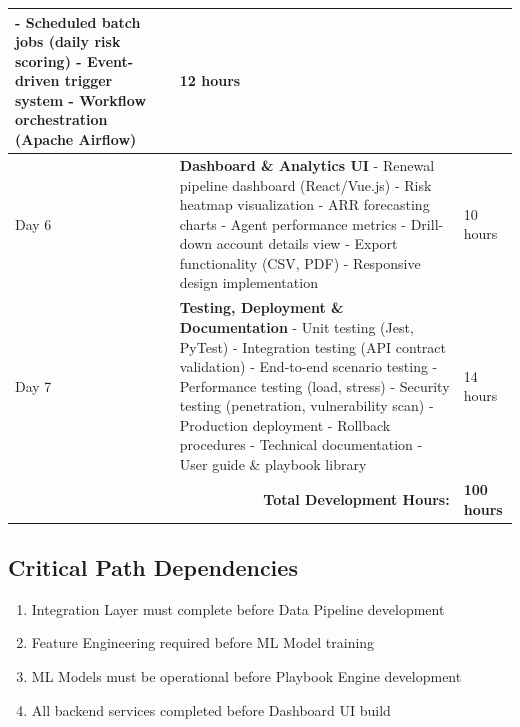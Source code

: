 \documentclass[12pt,a4paper]{article}
\begin{document}
\begin{longtable}{|p{2cm}|p{10cm}|p{2cm}|}
- Scheduled batch jobs (daily risk scoring) \newline
- Event-driven trigger system \newline
- Workflow orchestration (Apache Airflow) & 12 hours \\
\hline
Day 6 & \textbf{Dashboard \& Analytics UI} \newline
- Renewal pipeline dashboard (React/Vue.js) \newline
- Risk heatmap visualization \newline
- ARR forecasting charts \newline
- Agent performance metrics \newline
- Drill-down account details view \newline
- Export functionality (CSV, PDF) \newline
- Responsive design implementation & 10 hours \\
\hline
Day 7 & \textbf{Testing, Deployment \& Documentation} \newline
- Unit testing (Jest, PyTest) \newline
- Integration testing (API contract validation) \newline
- End-to-end scenario testing \newline
- Performance testing (load, stress) \newline
- Security testing (penetration, vulnerability scan) \newline
- Production deployment \newline
- Rollback procedures \newline
- Technical documentation \newline
- User guide \& playbook library & 14 hours \\
\hline
\multicolumn{2}{|r|}{\textbf{Total Development Hours:}} & \textbf{100 hours} \\
\hline
\end{longtable}

\subsection{Critical Path Dependencies}
\begin{enumerate}
    \item Integration Layer must complete before Data Pipeline development
    \item Feature Engineering required before ML Model training
    \item ML Models must be operational before Playbook Engine development
    \item All backend services completed before Dashboard UI build
\end{enumerate}
\end{document}
